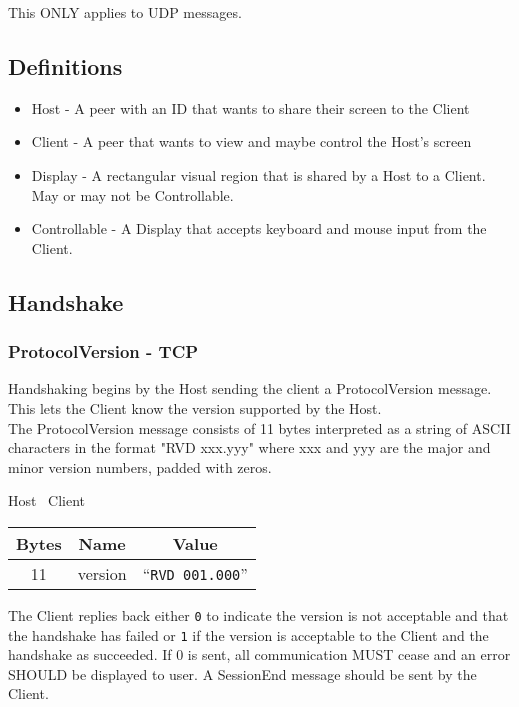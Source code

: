 This ONLY applies to UDP messages.

\subsection{Definitions}

\begin{itemize}
    \item Host - A peer with an ID that wants to share their screen to the Client
    \item Client - A peer that wants to view and maybe control the Host's screen
    \item Display - A rectangular visual region that is shared by a Host to a Client. May or may not be
    Controllable.
    \item Controllable - A Display that accepts keyboard and mouse input from the Client.
\end{itemize}

\subsection{Handshake}

\subsubsection{ProtocolVersion - TCP}
Handshaking begins by the Host sending the client a ProtocolVersion message. This lets the Client know the
version supported by the Host.\\

The ProtocolVersion message consists of 11 bytes interpreted as a string of ASCII characters in the format
"RVD xxx.yyy" where xxx and yyy are the major and minor version numbers, padded with zeros.

\begin{center}
    Host \textrightarrow\ Client\\
    \begin{tabular}{|c|c|c|}
        \hline
        \textbf{Bytes} & \textbf{Name} & \textbf{Value}           \\
        \hline
        11             & version       & ``\texttt{RVD 001.000}'' \\
        \hline
    \end{tabular}
\end{center}

The Client replies back either \texttt{0} to indicate the version is not acceptable and that the handshake has
failed or \texttt{1} if the version is acceptable to the Client and the handshake as succeeded. If 0 is sent, all
communication MUST cease and an error SHOULD be displayed to user. A SessionEnd message should be sent by
the Client.

